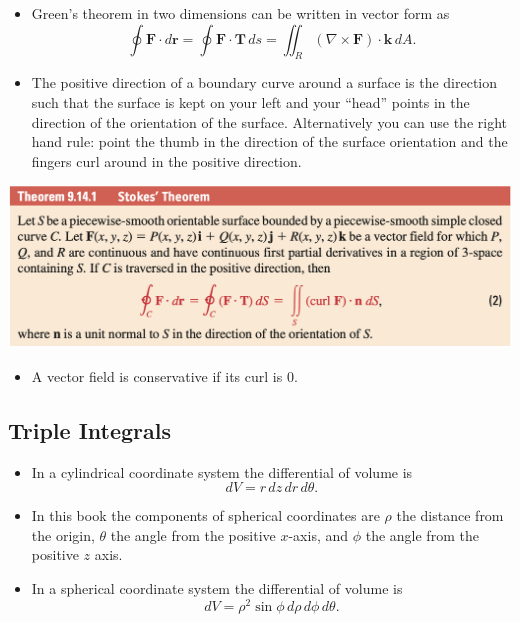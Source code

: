 \documentclass{article}
\begin{document}
\begin{itemize}
  \item Green's theorem in two dimensions can be written in vector form as \[\oint \mathbf{F} \cdot d \mathbf{r} = \oint \mathbf{F} \cdot \mathbf{T} \,ds = \iint_R (\nabla \times \mathbf{F}) \cdot \mathbf{k} \,dA.\]

  \item The positive direction of a boundary curve around a surface is the direction such that the surface is kept on your left and your ``head'' points in the direction of the orientation of the surface. Alternatively you can use the right hand rule: point the thumb in the direction of the surface orientation and the fingers curl around in the positive direction.
\end{itemize}

\includegraphics[scale=0.443]{stokes-theorem}

\begin{itemize}
\item A vector field is conservative if its curl is $0$.
\end{itemize}

\subsection{Triple Integrals}

\begin{itemize}
  \item In a cylindrical coordinate system the differential of volume is \[dV = r \,dz \,dr \,d\theta.\]

  \item In this book the components of spherical coordinates are $\rho$ the distance from the origin, $\theta$ the angle from the positive $x$-axis, and $\phi$ the angle from the positive $z$ axis.

  \item In a spherical coordinate system the differential of volume is \[dV = \rho^2 \sin \phi \,d\rho \,d\phi \,d\theta.\]
\end{itemize}
\end{document}
